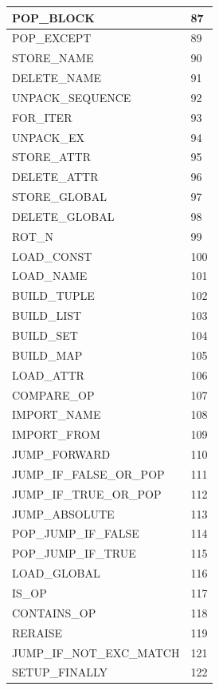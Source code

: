 \begin{table}
\begin{tabular}{|l|l|}
        POP\_BLOCK & 87 \\ \hline
        POP\_EXCEPT & 89 \\ \hline
        STORE\_NAME & 90 \\ \hline
        DELETE\_NAME & 91 \\ \hline
        UNPACK\_SEQUENCE & 92 \\ \hline
        FOR\_ITER & 93 \\ \hline
        UNPACK\_EX & 94 \\ \hline
        STORE\_ATTR & 95 \\ \hline
        DELETE\_ATTR & 96 \\ \hline
        STORE\_GLOBAL & 97 \\ \hline
        DELETE\_GLOBAL & 98 \\ \hline
        ROT\_N & 99 \\ \hline
        LOAD\_CONST & 100 \\ \hline
        LOAD\_NAME & 101 \\ \hline
        BUILD\_TUPLE & 102 \\ \hline
        BUILD\_LIST & 103 \\ \hline
        BUILD\_SET & 104 \\ \hline
        BUILD\_MAP & 105 \\ \hline
        LOAD\_ATTR & 106 \\ \hline
        COMPARE\_OP & 107 \\ \hline
        IMPORT\_NAME & 108 \\ \hline
        IMPORT\_FROM & 109 \\ \hline
        JUMP\_FORWARD & 110 \\ \hline
        JUMP\_IF\_FALSE\_OR\_POP & 111 \\ \hline
        JUMP\_IF\_TRUE\_OR\_POP & 112 \\ \hline
        JUMP\_ABSOLUTE & 113 \\ \hline
        POP\_JUMP\_IF\_FALSE & 114 \\ \hline
        POP\_JUMP\_IF\_TRUE & 115 \\ \hline
        LOAD\_GLOBAL & 116 \\ \hline
        IS\_OP & 117 \\ \hline
        CONTAINS\_OP & 118 \\ \hline
        RERAISE & 119 \\ \hline
        JUMP\_IF\_NOT\_EXC\_MATCH & 121 \\ \hline
        SETUP\_FINALLY & 122 \\ \hline

\end{tabular}
\end{table}
